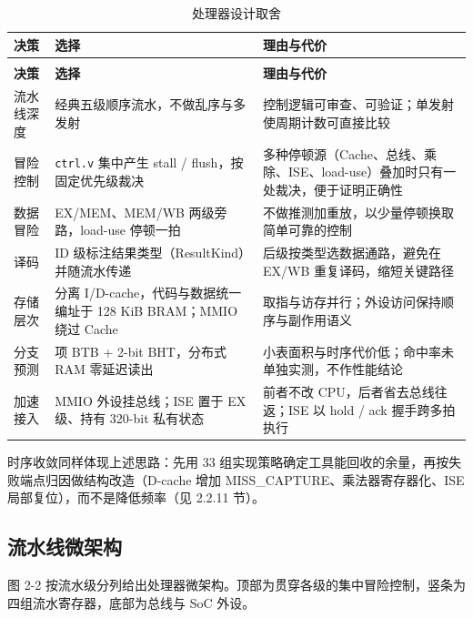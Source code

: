 {\small
\renewcommand{\thetable}{2-2}
\begin{longtable}{@{}>{\raggedright\arraybackslash}p{}>{\raggedright\arraybackslash}p{}>{\raggedright\arraybackslash}p{}@{}}
\caption{处理器设计取舍}\label{tab:2-2}\\
\toprule
\textbf{决策} & \textbf{选择} & \textbf{理由与代价} \\
\midrule
\endfirsthead
\multicolumn{3}{@{}l}{\footnotesize 续表 2-2}\\
\toprule
\textbf{决策} & \textbf{选择} & \textbf{理由与代价} \\
\midrule
\endhead
流水线深度 & 经典五级顺序流水，不做乱序与多发射 & 控制逻辑可审查、可验证；单发射使周期计数可直接比较 \\
冒险控制 & \texttt{ctrl.\allowbreak{}v} 集中产生 stall / flush，按固定优先级裁决 & 多种停顿源（Cache、总线、乘除、ISE、load-use）叠加时只有一处裁决，便于证明正确性 \\
数据冒险 & EX/MEM、MEM/WB 两级旁路，load-use 停顿一拍 & 不做推测加重放，以少量停顿换取简单可靠的控制 \\
译码 & ID 级标注结果类型（ResultKind）并随流水传递 & 后级按类型选数据通路，避免在 EX/WB 重复译码，缩短关键路径 \\
存储层次 & 分离 I/D-cache，代码与数据统一编址于 128 KiB BRAM；MMIO 绕过 Cache & 取指与访存并行；外设访问保持顺序与副作用语义 \\
分支预测 & 64 项 BTB + 2-bit BHT，分布式 RAM 零延迟读出 & 小表面积与时序代价低；命中率未单独实测，不作性能结论 \\
加速接入 & MMIO 外设挂总线；ISE 置于 EX 级、持有 320-bit 私有状态 & 前者不改 CPU，后者省去总线往返；ISE 以 hold / ack 握手跨多拍执行 \\
\bottomrule
\end{longtable}
}

时序收敛同样体现上述思路：先用 33 组实现策略确定工具能回收的余量，再按失败端点归因做结构改造（D-cache 增加 MISS\_CAPTURE、乘法器寄存器化、ISE 局部复位），而不是降低频率（见 2.2.11 节）。

\Needspace{85pt}

\subsection{流水线微架构}

图 2-2 按流水级分列给出处理器微架构。顶部为贯穿各级的集中冒险控制，竖条为四组流水寄存器，底部为总线与 SoC 外设。

